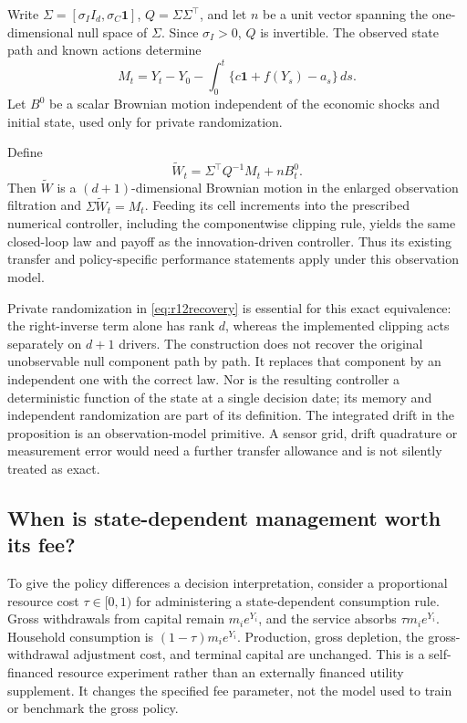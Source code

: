 Write $\Sigma=[\sigma_I I_d,\sigma_C\bm1]$, $Q=\Sigma\Sigma^\top$, and let $n$ be a unit vector spanning the one-dimensional null space of $\Sigma$. Since $\sigma_I>0$, $Q$ is invertible. The observed state path and known actions determine
\[
 M_t=Y_t-Y_0-\int_0^t\{c\bm1+f(Y_s)-a_s\}\,ds.
\]
Let $B^0$ be a scalar Brownian motion independent of the economic shocks and initial state, used only for private randomization.

\begin{proposition}\label{prop:r12observation}
Define
\begin{equation}\label{eq:r12recovery}
 \widetilde W_t=\Sigma^\top Q^{-1}M_t+nB^0_t.
\end{equation}
Then $\widetilde W$ is a $(d+1)$-dimensional Brownian motion in the enlarged observation filtration and $\Sigma\widetilde W_t=M_t$. Feeding its cell increments into the prescribed numerical controller, including the componentwise clipping rule, yields the same closed-loop law and payoff as the innovation-driven controller. Thus its existing transfer and policy-specific performance statements apply under this observation model.
\end{proposition}

Private randomization in \eqref{eq:r12recovery} is essential for this exact equivalence: the right-inverse term alone has rank $d$, whereas the implemented clipping acts separately on $d+1$ drivers. The construction does not recover the original unobservable null component path by path. It replaces that component by an independent one with the correct law. Nor is the resulting controller a deterministic function of the state at a single decision date; its memory and independent randomization are part of its definition. The integrated drift in the proposition is an observation-model primitive. A sensor grid, drift quadrature or measurement error would need a further transfer allowance and is not silently treated as exact.

\subsection{When is state-dependent management worth its fee?}\label{sec:r12fees}
To give the policy differences a decision interpretation, consider a proportional resource cost $\tau\in[0,1)$ for administering a state-dependent consumption rule. Gross withdrawals from capital remain $m_i e^{Y_i}$, and the service absorbs $\tau m_i e^{Y_i}$. Household consumption is $(1-\tau)m_i e^{Y_i}$. Production, gross depletion, the gross-withdrawal adjustment cost, and terminal capital are unchanged. This is a self-financed resource experiment rather than an externally financed utility supplement. It changes the specified fee parameter, not the model used to train or benchmark the gross policy.

